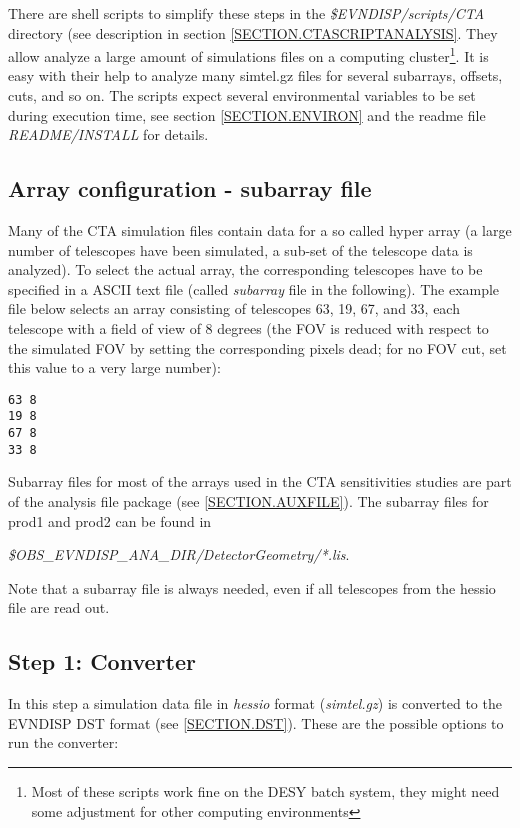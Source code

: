 \documentclass[titlepage,a4paper,twoside,11pt]{report}
\begin{document}
There are shell scripts to simplify these steps in the {\it \$EVNDISP/scripts/CTA} directory (see description in section \ref{SECTION.CTASCRIPTANALYSIS}.
They allow analyze a large amount of simulations files on a computing cluster\footnote{Most of these scripts work fine on the DESY batch system, they might need some adjustment for other computing environments}.
It is easy with their help to analyze many simtel.gz files for several subarrays, offsets, cuts, and so on. 
The scripts expect several environmental variables to be set during execution time, see section \ref{SECTION.ENVIRON} and the readme file {\it README/INSTALL} for details.

\subsection{Array configuration - subarray file}

Many of the CTA simulation files contain data for a so called hyper array 
(a large number of telescopes have been simulated, a sub-set of the telescope data is analyzed).
To select the actual array, the corresponding telescopes have to be specified in a ASCII text file (called {\it subarray} file in the following).
The  example file below selects an array consisting of telescopes 63, 19, 67, and 33, each telescope
with a field of view of 8 degrees (the FOV is reduced with respect to the simulated FOV by setting the corresponding pixels dead; for no FOV cut, set this value to a very large number):

\begin{lstlisting}
63 8
19 8
67 8
33 8
\end{lstlisting}

Subarray files for most of the arrays used in the CTA sensitivities studies are part of the analysis file package 
(see \ref{SECTION.AUXFILE}). The subarray files for prod1 and prod2 can be found in 

{\it \$OBS\_EVNDISP\_ANA\_DIR/DetectorGeometry/*.lis}.

Note that a subarray file is always needed, even if all telescopes from the hessio file are read out.

\subsection{Step 1: Converter}

In this step a simulation data file in {\it hessio} format ({\it simtel.gz}) is converted to the EVNDISP DST format 
(see \ref{SECTION.DST}). These are the possible options to run the converter:
\end{document}
